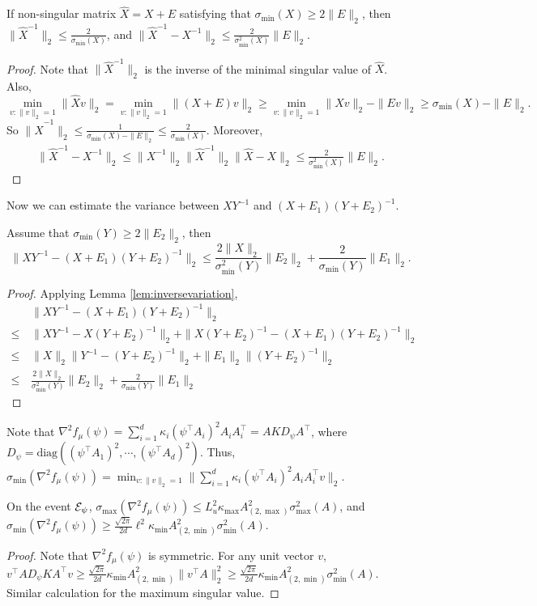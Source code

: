 \begin{lemma}
\label{lem:inversevariation}
If non-singular matrix $\widehat{X} = X+E$ satisfying that $\sigma_{\min}(X)\ge2\|E\|_2$, then $\|\widehat{X}^{-1}\|_2 \le \frac{2}{\sigma_{\min}(X)}$, and $\|\widehat{X}^{-1} - X^{-1} \|_2 \le \frac{2}{\sigma_{\min}^2(X)}\|E\|_2$.
\end{lemma} 
\begin{proof}
Note that $\|\widehat{X}^{-1}\|_2$ is the inverse of the minimal singular value of $\widehat{X}$. Also, 
\[
 \min_{v:\|v\|_2=1} \|\widehat{X}v\|_2 = \min_{v:\|v\|_2=1}\|(X+E)v\|_2 \ge \min_{v:\|v\|_2=1} \|Xv\|_2 - \|Ev\|_2 \ge \sigma_{\min}(X) - \|E\|_2.
\]
So $\|\widehat{X}^{-1}\|_2 \le \frac{1}{\sigma_{\min}(X) - \|E\|_2} \le \frac{2}{\sigma_{\min}(X)}$. Moreover,
\begin{align*}
\|\widehat{X}^{-1} - X^{-1} \|_2 \le \|X^{-1}\|_2\|\widehat{X}^{-1}\|_2\|\widehat{X} - X\|_2
\le \frac{2}{\sigma_{\min}^2(X)}\|E\|_2.
\end{align*}
\end{proof}
Now we can estimate the variance between $XY^{-1}$ and $(X+E_1)(Y+E_2)^{-1}$.
\begin{lemma}
\label{lem:Mvariation}
Assume that $\sigma_{\min}(Y)\ge2\|E_2\|_2$, then
\[
\| XY^{-1} - (X+E_1)(Y+E_2)^{-1}\|_2 \le \frac{2\|X\|_2}{\sigma_{\min}^2(Y)}\|E_2\|_2 + \frac{2}{\sigma_{\min}(Y)}\|E_1\|_2.
\]
\end{lemma}
\begin{proof}
Applying Lemma \ref{lem:inversevariation},
\begin{align*}
	& \| XY^{-1} - (X+E_1)(Y+E_2)^{-1}\|_2 \\
\le\, & \| XY^{-1} - X(Y+E_2)^{-1}\|_2 + \| X(Y+E_2)^{-1} - (X+E_1)(Y+E_2)^{-1}\|_2 \\
\le\, & \|X\|_2\| Y^{-1} - (Y+E_2)^{-1}\|_2 + \|E_1\|_2\|(Y+E_2)^{-1}\|_2\\
\le\, & \frac{2\|X\|_2}{\sigma_{\min}^2(Y)}\|E_2\|_2 + \frac{2}{\sigma_{\min}(Y)}\|E_1\|_2
\end{align*}
\end{proof}


Note that $\nabla^2f_{\mu}(\psi) = \sum_{i=1}^{d} \kappa_i(\psi^{\top}A_i)^2A_iA_i^{\top} = AKD_{\psi}A^{\top}$,  where $D_{\psi} = \text{diag}\left((\psi^{\top}A_1)^2,\cdots, (\psi^{\top}A_d)^2\right)$. 
Thus, $\sigma_{\min}(\nabla^2f_{\mu}(\psi)) = \min_{v:\|v\|_2=1}\|\sum_{i=1}^{d} \kappa_i(\psi^{\top}A_i)^2A_iA_i^{\top}v\|_2$. 
\begin{lemma}
\label{lem:boundsigmaminnabla}
On the event $\mathcal{E}_{\psi}$, $\sigma_{\max}(\nabla^2f_{\mu}(\psi)) \le L_u^2 \kappa_{\max}A^2_{(2,\max)}\sigma_{\max}^2(A)$, and
 $\sigma_{\min}(\nabla^2f_{\mu}(\psi)) \ge \frac{\sqrt{2\pi}}{2d} \ell^2\kappa_{\min}A^2_{(2,\min)}\sigma_{\min}^2(A)$.
\end{lemma}
\begin{proof}
Note that $\nabla^2f_{\mu}(\psi)$ is symmetric. 
For any unit vector $v$, $v^{\top}AD_{\psi}KA^{\top}v \ge \frac{\sqrt{2\pi}}{2d}\kappa_{\min} A^2_{(2,\min)}\|v^{\top}A\|_2^2 \ge \frac{\sqrt{2\pi}}{2d}\kappa_{\min}A^2_{(2,\min)}\sigma_{\min}^2(A)$. Similar calculation for the maximum singular value.
\end{proof}

